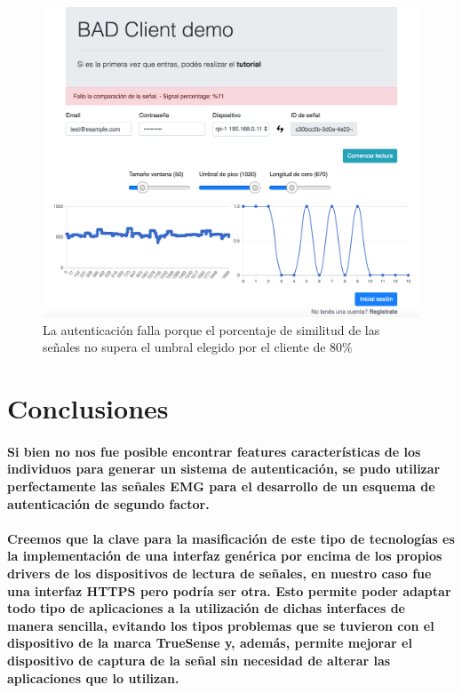 \documentclass{article}
\begin{document}
\begin{figure}[ht]
    \centering
    \includegraphics[width=\textwidth]{error_1_res.png}%
    \caption{La autenticación falla porque el porcentaje de similitud de las señales no supera el umbral elegido por el cliente de 80\%}
    \label{fig:error-1}
\end{figure}

\section{Conclusiones}
\paragraph{
Si bien no nos fue posible encontrar features características de los individuos para generar un sistema de autenticación, se pudo utilizar perfectamente las señales EMG para el desarrollo de un esquema de autenticación de segundo factor.
}
\paragraph{
Creemos que la clave para la masificación de este tipo de tecnologías es la implementación de una interfaz genérica por encima de los propios drivers de los dispositivos de lectura de señales, en nuestro caso fue una interfaz HTTPS pero podría ser otra. Esto permite poder adaptar todo tipo de aplicaciones a la utilización de dichas interfaces de manera sencilla, evitando los tipos problemas que se tuvieron con el dispositivo de la marca TrueSense y, además, permite mejorar el dispositivo de captura de la señal sin necesidad de alterar las aplicaciones que lo utilizan.
}
\end{document}
